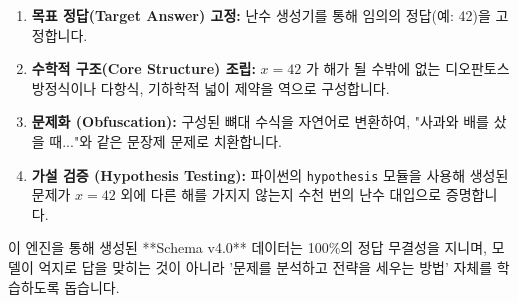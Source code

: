 \begin{enumerate}
    \item \textbf{목표 정답(Target Answer) 고정:} 난수 생성기를 통해 임의의 정답(예: 42)을 고정합니다.
    \item \textbf{수학적 구조(Core Structure) 조립:} $x=42$ 가 해가 될 수밖에 없는 디오판토스 방정식이나 다항식, 기하학적 넓이 제약을 역으로 구성합니다.
    \item \textbf{문제화 (Obfuscation):} 구성된 뼈대 수식을 자연어로 변환하여, "사과와 배를 샀을 때..."와 같은 문장제 문제로 치환합니다.
    \item \textbf{가설 검증 (Hypothesis Testing):} 파이썬의 \texttt{hypothesis} 모듈을 사용해 생성된 문제가 $x=42$ 외에 다른 해를 가지지 않는지 수천 번의 난수 대입으로 증명합니다.
\end{enumerate}
이 엔진을 통해 생성된 **Schema v4.0** 데이터는 100\%의 정답 무결성을 지니며, 모델이 억지로 답을 맞히는 것이 아니라 '문제를 분석하고 전략을 세우는 방법' 자체를 학습하도록 돕습니다.
